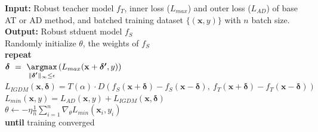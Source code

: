 \documentclass{article} %
\begin{document}
\begin{algorithm}[h]
\caption{Main Algorithm}
\label{alg:algorithm}
\hspace*{0.1in}\textbf{Input:} Robust teacher model $f_T$, inner loss ($L_{max}$) and outer loss ($L_{AD}$) of base AT 
or AD \hspace*{0.2in}method, and batched training dataset $\{(\mathbf{x}, y)\}$ with $n$ batch size.\\
\hspace*{0.1in}\textbf{Output:} Robust stduent model $f_S$ \vspace{0.1in}\\
\hspace*{0.1in}Randomly initialize $\theta$, the weights of $f_{S}$ \\
\hspace*{0.1in}\textbf{repeat} 
\\
\hspace*{0.2in}$\boldsymbol{\delta} \ = \ \underset{\| \boldsymbol{\delta'} \|_\infty \leq \epsilon}{\argmax}\left   (L_{max}(\mathbf{x}+\boldsymbol{\delta'}, y ) \right )$ 
\vspace{0.05in}\\
\hspace*{0.2in}$L_{IGDM}(\mathbf{x}, \boldsymbol{\delta}) = T(\alpha) \cdot D(f_S(\textbf{x} +  \boldsymbol{\delta} ) - f_S(\textbf{x} -  \boldsymbol{\delta} ), \ f_T(\textbf{x} +  \boldsymbol{\delta}) - f_T(\textbf{x} -  \boldsymbol{\delta} ))$
\vspace{0.05in}\\
\hspace*{0.2in}$L_{min}(\mathbf{x}, y) = L_{AD}(\mathbf{x}, y) + L_{IGDM}(\mathbf{x}, \boldsymbol{\delta})$
\vspace{0.05in}\\
\hspace*{0.2in}$\theta \gets -\eta \frac{1}{n} \sum_{i=1}^n \nabla_{\theta} L_{min}(\mathbf{x}_i, y_i)$
\vspace{0.05in}\\
\hspace*{0.1in}\textbf{until} training converged

\end{algorithm}
\end{document}
